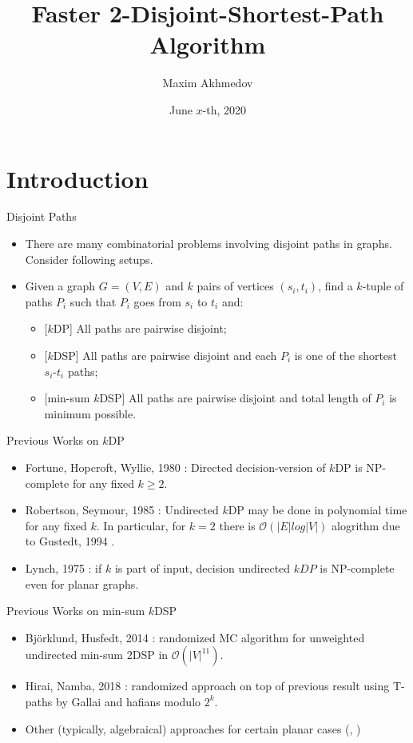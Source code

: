 \documentclass{beamer}
\title[Faster 2DSP]{Faster 2-Disjoint-Shortest-Path Algorithm}
\institute[MSU \& Yandex]{Moscow State University and Yandex}
\author{Maxim Akhmedov}
\date{June $x$-th, 2020}
\newcommand{\OO}{\mathcal{O}}
\begin{document}
\begin{frame}
	\titlepage
\end{frame}

\section{Introduction}

\begin{frame}{Disjoint Paths}
    \begin{itemize}
        \item There are many combinatorial problems involving disjoint paths in graphs. Consider following setups.
        \item Given a graph $G = (V, E)$ and $k$ pairs of vertices $(s_i, t_i)$, find a $k$-tuple of paths $P_i$ such that $P_i$ goes from $s_i$ to $t_i$ and:
        \begin{itemize}
            \item{}[$k$DP] All paths are pairwise disjoint;
            \item{}[$k$DSP] All paths are pairwise disjoint and each $P_i$ is one of the shortest $s_i$-$t_i$ paths;
            \item{}[min-sum $k$DSP] All paths are pairwise disjoint and total length of $P_i$ is minimum possible.
        \end{itemize}
    \end{itemize}
\end{frame}

\begin{frame}{Previous Works on $k$DP}
    \begin{itemize}
        \item Fortune, Hopcroft, Wyllie, 1980 \cite{FHW}: Directed decision-version of $k$DP is NP-complete for any fixed $k \geq 2$.
        \item Robertson, Seymour, 1985 \cite{RS}: Undirected $k$DP may be done in polynomial time for any fixed $k$. In particular, for $k = 2$ there is $\OO(|E| log |V|)$ alogrithm due to Gustedt, 1994 \cite{Gustedt}.
        \item Lynch, 1975 \cite{Lynch}: if $k$ is part of input, decision undirected $kDP$ is NP-complete even for planar graphs.
    \end{itemize}
\end{frame}

\begin{frame}{Previous Works on min-sum $k$DSP}
    \begin{itemize}
        \item Bj\"{o}rklund, Husfedt, 2014 \cite{BHICALP}: randomized MC algorithm for unweighted undirected min-sum $2$DSP in $\OO(|V|^{11})$.
        \item Hirai, Namba, 2018 \cite{HN}: randomized approach on top of previous result using T-paths by Gallai and hafians modulo $2^k$.
        \item Other (typically, algebraical) approaches for certain planar cases (\cite{Datta}, \cite{BHPlanar})
    \end{itemize}
\end{frame}
\end{document}
